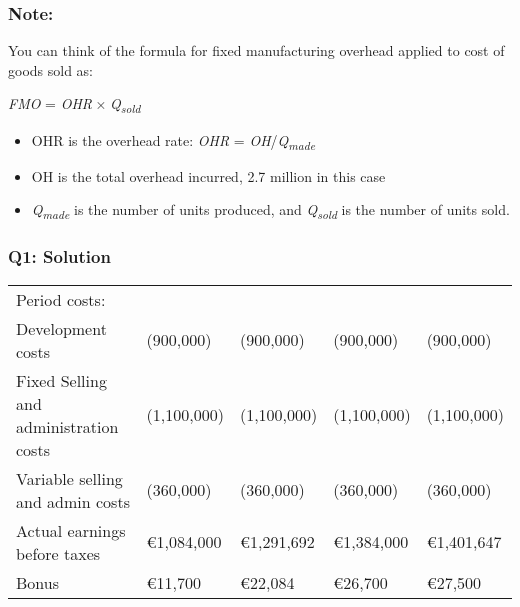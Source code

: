\hypertarget{note}{%
\subsubsection{Note:}\label{note}}

You can think of the formula for fixed manufacturing overhead applied to
cost of goods sold as:

{\emph{FMO} = \emph{OHR} × \emph{Q}\textsubscript{\emph{sold}}}

\begin{itemize}
\tightlist
\item
  OHR is the overhead rate:
  {\emph{OHR} = \emph{OH}/\emph{Q}\textsubscript{\emph{made}}}
\item
  OH is the total overhead incurred, 2.7 million in this case
\item
  {\emph{Q}\textsubscript{\emph{made}}} is the number of units produced,
  and {\emph{Q}\textsubscript{\emph{sold}}} is the number of units sold.
\end{itemize}

\hypertarget{q1-solution-2}{%
\subsubsection{Q1: Solution}\label{q1-solution-2}}

\begin{longtable}[]{@{}
  >{\raggedright\arraybackslash}p{}
  >{\raggedright\arraybackslash}p{}
  >{\raggedright\arraybackslash}p{}
  >{\raggedright\arraybackslash}p{}
  >{\raggedright\arraybackslash}p{}@{}}
\toprule\noalign{}
\endhead
\bottomrule\noalign{}
\endlastfoot
Period costs: & & & & \\
Development costs & (900,000) & (900,000) & (900,000) & (900,000) \\
Fixed Selling and administration costs & (1,100,000) & (1,100,000) &
(1,100,000) & (1,100,000) \\
Variable selling and admin costs & (360,000) & (360,000) & (360,000) &
(360,000) \\
Actual earnings before taxes & €1,084,000 & €1,291,692 & €1,384,000 &
€1,401,647 \\
Bonus & €11,700 & €22,084 & €26,700 & €27,500 \\
\end{longtable}

